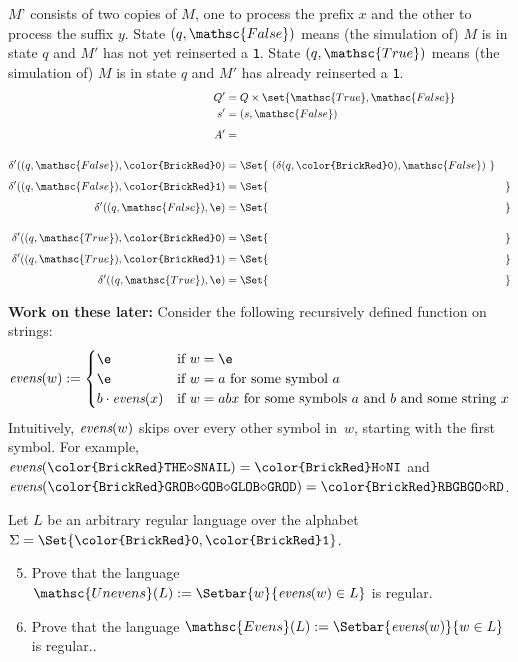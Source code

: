 \documentclass[11pt]{article}
\def\Sym#1{\texttt{\color{BrickRed}#1}}
\def\ForceSym#1{\setbox0\hbox{A}\hbox to \wd0{\hss #1\hss}}
\def\Blank{\ForceSym{$\diamond$}}
\begin{document}
\begin{enumerate}
\begin{Solution}
$M’$ consists of two copies of $M$, one to process the prefix $x$ and the other to process the suffix $y$.  State $(q, \mathsc{False})$ means (the simulation of) $M$ is in state $q$ and $M'$ has not yet reinserted a \Sym1.  State $(q, \mathsc{True})$ means (the simulation of) $M$ is in state $q$ and $M'$ has already reinserted a \Sym1.
%
\begin{align*}
	Q' & = Q \times \set{\mathsc{True}, \mathsc{False}}
\\
	s' & = (s, \mathsc{False})
\\[1ex]
	A' & = 
\\[3ex]
	\delta'((q, \mathsc{False}), \Sym0)
			& = \Set{~ (\delta(q, \Sym0),\strut \mathsc{False}) ~}
\\[1ex]
	\delta'((q, \mathsc{False}), \Sym1) & = \Set{\strut\hspace{3in}}
\\[1ex]
	\delta'((q, \mathsc{False}), \e) & = \Set{\strut\hspace{3in}}
\\[3ex]
	\delta'((q, \mathsc{True}), \Sym0) & = \Set{\strut\hspace{3in}}
\\[1ex]
	\delta'((q, \mathsc{True}), \Sym1) & = \Set{\strut\hspace{3in}}
\\[1ex]
	\delta'((q, \mathsc{True}), \e) & = \Set{\strut\hspace{3in}}
\end{align*}
\end{Solution}


\end{enumerate}

\newpage
\noindent
\textbf{Work on these later:}
Consider the following recursively defined function on strings:
\[
	\emph{evens}(w) := \begin{cases}
		\e	& \text{if $w = \e$} \\
		\e	& \text{if $w = a$ for some symbol $a$} \\
		b \cdot \emph{evens}(x)
			& \text{if $w = abx$ for some symbols $a$ and $b$ and some string $x$}
	\end{cases}
\]
Intuitively, $\emph{evens}(w)$ skips over every other symbol in~$w$, starting with the first symbol.  For example, $\emph{evens}(\Sym{THE\Blank SNAIL}) = \Sym{H\Blank NI}$ and $\emph{evens}(\Sym{GROB\Blank GOB\Blank GLOB\Blank GROD}) = \Sym{RBGBGO\Blank RD}$.

Let $L$ be an arbitrary regular language over the alphabet $\Sigma = \Set{\Sym0,\Sym1}$.


\begin{enumerate}
\setcounter{enumi}{4}
\item
Prove that the language $\mathsc{Unevens}(L) := \Setbar{w}{\emph{evens}(w)\in L}$ is regular.

\item
Prove that the language $\mathsc{Evens}(L) := \Setbar{\emph{evens}(w)}{w\in L}$ is regular..
\end{enumerate}
\end{document}
